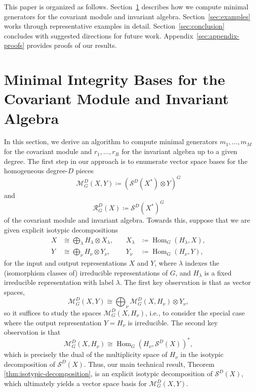 \documentclass[11pt]{article}
\newcommand{\scM}{\mathcal{M}}
\newcommand{\scR}{\mathcal{R}}
\newcommand{\scS}{\mathcal{S}}
\newcommand{\HomG}[2]{\operatorname{Hom}_G\!\left(#1,#2\right)}
\theoremstyle{definition}
\begin{document}
This paper is organized as follows.
Section~\ref{sec:theory-and-algorithms} describes how we compute minimal generators for the covariant module and invariant algebra.
Section~\ref{sec:examples} works through representative examples in detail.
Section~\ref{sec:conclusion} concludes with suggested directions for future work.
Appendix~\ref{sec:appendix-proofs} provides proofs of our results.

\section{Minimal Integrity Bases for the Covariant Module and Invariant Algebra}\label{sec:theory-and-algorithms}


In this section, we derive an algorithm to compute minimal generators $m_1,\dots,m_M$ for the covariant module and $r_1,\dots,r_R$ for the invariant algebra up to a given degree.
The first step in our approach is to enumerate vector space bases for the homogeneous degree-$D$ pieces
\[
  \scM_G^D(X,Y)\coloneq\left(\scS^D(X^*)\otimes Y\right)^G
\]
and
\[
  \scR_G^D(X)\coloneq\scS^D(X^*)^G
\]
of the covariant module and invariant algebra.
Towards this, suppose that we are given explicit isotypic decompositions
\[
  \begin{aligned}\label{eq:input-output-isotypic}
    X &\cong \bigoplus_{\lambda} H_\lambda\otimes X_\lambda,
    &\quad
    X_\lambda &\coloneq \HomG{H_\lambda}{X},\\
    Y &\cong \bigoplus_{\nu} H_\nu\otimes Y_\nu,
    &\quad
    Y_\nu &\coloneq \HomG{H_\nu}{Y},
  \end{aligned}
\]
for the input and output representations $X$ and $Y$, where $\lambda$ indexes the (isomorphism classes of) irreducible representations of $G$, and $H_\lambda$ is a fixed irreducible representation with label $\lambda$.
The first key observation is that as vector spaces,
\begin{equation}\label{eq:output-reduction}
  \scM_G^D(X,Y)
  \cong
  \bigoplus_{\nu}
  \scM_G^D(X,H_\nu)\otimes Y_\nu,
\end{equation}
so it suffices to study the spaces $\scM_G^D(X,H_\nu)$, i.e., to consider the special case where the output representation $Y = H_\nu$ is irreducible.
The second key observation is that
\begin{equation}\label{eq:duality}
  \scM_G^D(X,H_\nu)
  \cong
  \HomG{H_\nu}{\scS^D(X)}^*,
\end{equation}
which is precisely the dual of the multiplicity space of $H_\nu$ in the isotypic decomposition of $\scS^D(X)$.
Thus, our main technical result, Theorem \ref{thm:isotypic-decomposition}, is an explicit isotypic decomposition of $\scS^D(X)$, which ultimately yields a vector space basis for $\scM_G^D(X,Y)$.
\end{document}
